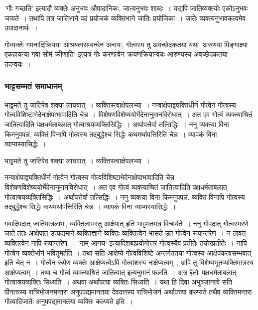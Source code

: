 				'गौः गच्छति' इत्यादौ व्यक्तेः अनुभवः औपादानिकः, जात्यनुभवः शाब्दः~। यद्यपि जातिव्यक्त्योः एकोऽनुभवः जायते~। तथापि तत्र जातिभाने पदं प्रयोजकं व्यक्तिभाने जातिः प्रयोजिका~। जातेः व्यक्त्यनुभावकत्वमेव उपादानार्थः~।

				गोव्यक्तेः गमनादिक्रियया आश्रयतासम्बन्धेन अन्वयः, गोत्वस्य तु अवच्छेदकतया यथा 'अरुणया पिङ्गाक्ष्या एकहायन्या गवा सोमं क्रीणाति' इत्यत्र गोः करणत्वेन क्रयणक्रियान्वयः आरुण्यस्य अवच्छेदकतया तदन्वयः~। 

			\subsubsection{भाट्टसम्मतं समाधानम्}
				\begin{small}

					भाट्टमते तु जातिरेव शक्या लाघवात्~। व्यक्तिस्त्वाक्षेपलभ्या~। नन्वाक्षेपाद्व्यक्तिधीर्न गोत्वेन गोत्वस्य गोत्वविशिष्टाभेदेनाक्षेपाभावादिति चेन्न~। विशेषणविशेष्ययोर्भेदेनानुमानविरोधात्~। अत एव गोत्वं व्यक्त्याश्रितं जातित्वादिति पक्षधर्मताबलात् गोत्वाश्रयव्यक्तिसिद्धिः~। अर्थापत्तेर्वा तत्सिद्धिः~। ननु व्यक्त्या विना किमनुपपन्नं, व्यक्तिं विनापि गोत्वस्य तद्बुद्धेश्च सिद्धेः कथमर्थापत्तिरिति चेन्न~। व्यापकं विना व्याप्यस्यासिद्धेः~।

					भाट्टमते तु जातिरेव शक्या लाघवात्~। व्यक्तिस्त्वाक्षेपलभ्या~। 

					नन्वाक्षेपाद्व्यक्तिधीर्न गोत्वेन गोत्वस्य गोत्वविशिष्टाभेदेनाक्षेपाभावादिति चेन्न~। विशेषणविशेष्ययोर्भेदेनानुमानविरोधात्~। अत एव गोत्वं व्यक्त्याश्रितं जातित्वादिति पक्षधर्मताबलात् गोत्वाश्रयव्यक्तिसिद्धिः~। अर्थापत्तेर्वा तत्सिद्धिः~। ननु व्यक्त्या विना किमनुपपन्नं, व्यक्तिं विनापि गोत्वस्य तद्बुद्धेश्च सिद्धेः कथमर्थापत्तिरिति चेन्न~। व्यापकं विना व्याप्यस्यासिद्धेः~। 
				\end{small}

				गवादिपदात् जातिमात्रलाभः, व्यक्तिलाभस्तु आक्षेपात् इति भाट्टमतमत्र विचार्यते~। ननु गोपदात् गोत्वस्मरणे जाते ततः आक्षेपात् उत्पद्यमाने व्यक्तिज्ञाने व्यक्तिः व्यक्तित्वेन भासते उत गोत्वेन रूपान्तरेण~। न तावत् व्यक्तित्वेन नापि रूपान्तरेण~। 'गाम् आनय' इत्यादिशब्दप्रयोगोत्तरं गोत्वस्यैव प्रतीतेः तयोरप्रतीतेः~। नापि गोत्वेन व्यक्तेर्भानं भवितुमर्हति~। तथा सति आक्षेप्ये गोत्वविशिष्टे अन्तर्गततया गोत्वस्य आक्षेपकत्वसम्भवात् इति चेत् न~। गोत्वेन रूपेण व्यक्तेः आक्षेप्यत्वेऽपि गोत्वांशस्य नाक्षेप्यत्वम्~, अपि तु विशेष्यभूतव्यक्तिमात्रस्य आक्षेप्यत्वम्~। तथा च गोत्वं व्यक्त्याश्रितं जातित्वात् इत्यनुमानं फलति~। अत्र हेतोः पक्षधर्मताबलात् गोत्वाश्रयव्यक्तिः सिध्यति~। अथवा अर्थापत्या व्यक्तिः सिध्यति~। यथा हि दिवा अभुञ्जानत्वे सति पीनत्वस्य रात्रिभोजनमन्तरा अनुपपद्यमानतया देवदत्तस्य रात्रिभोजनं अर्थापत्त्या कल्प्यते तथैव व्यक्तिमन्तरा गोत्वादिजातेः अनुपपद्यमानतया व्यक्तिः कल्प्यते इति~। 


